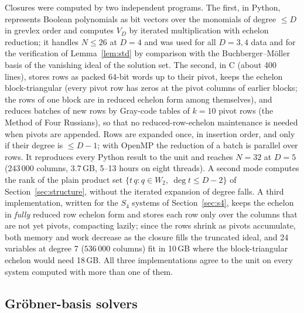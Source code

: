 \documentclass[11pt,a4paper]{article}
\theoremstyle{remark}\newtheorem{remark}{Remark}
\begin{document}
Closures were computed by two independent programs. The first, in Python, represents Boolean polynomials as bit vectors over the monomials of degree $\le D$ in grevlex order and computes $V_D$ by iterated multiplication with echelon reduction; it handles $N\le26$ at $D=4$ and was used for all $D=3,4$ data and for the verification of Lemma~\ref{lem:std} by comparison with the Buchberger--Möller basis of the vanishing ideal of the solution set. The second, in C (about 400 lines), stores rows as packed 64-bit words up to their pivot, keeps the echelon block-triangular (every pivot row has zeros at the pivot columns of earlier blocks; the rows of one block are in reduced echelon form among themselves), and reduces batches of new rows by Gray-code tables of $k=10$ pivot rows (the Method of Four Russians), so that no reduced-row-echelon maintenance is needed when pivots are appended. Rows are expanded once, in insertion order, and only if their degree is $\le D-1$; with OpenMP the reduction of a batch is parallel over rows. It reproduces every Python result to the unit and reaches $N=32$ at $D=5$ (243\,000 columns, 3.7\,GB, 5--13 hours on eight threads). A second mode computes the rank of the plain product set $\{t\,q: q\in W_2,\ \deg t\le D-2\}$ of Section~\ref{sec:structure}, without the iterated expansion of degree falls. A third implementation, written for the $S_4$ systems of Section~\ref{sec:s4}, keeps the echelon in \emph{fully} reduced row echelon form and stores each row only over the columns that are not yet pivots, compacting lazily; since the rows shrink as pivots accumulate, both memory and work decrease as the closure fills the truncated ideal, and 24 variables at degree 7 ($536\,000$ columns) fit in 10\,GB where the block-triangular echelon would need 18\,GB. All three implementations agree to the unit on every system computed with more than one of them.

\subsection{Gröbner-basis solvers}\label{sec:m4gb}
\end{document}
